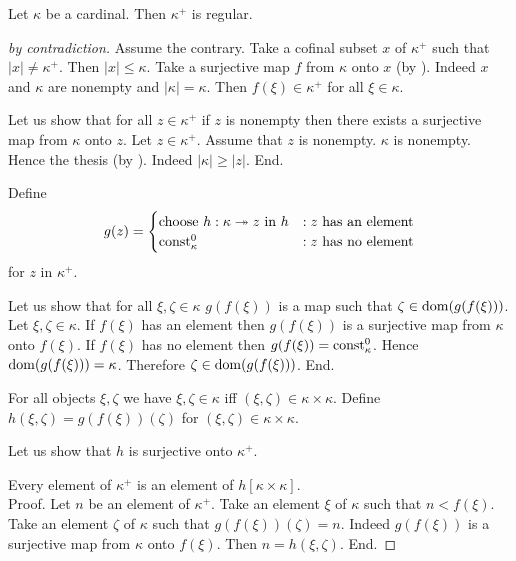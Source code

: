 \documentclass{article}
\begin{document}
  \begin{forthel}
    \begin{theorem*}[title=Hausdorff]
      Let $\kappa$ be a cardinal.
      Then $\kappa^+$ is regular.
    \end{theorem*}
    \begin{proof}[by contradiction]
      Assume the contrary.
      Take a cofinal subset $x$ of $\kappa^+$ such that $|x| \neq \kappa^+$.
      Then $|x| \leq \kappa$.
      Take a surjective map $f$ from $\kappa$ onto $x$ (by ).
      Indeed $x$ and $\kappa$ are nonempty and $|\kappa| = \kappa$.
      Then $f(\xi) \in \kappa^+$ for all $\xi \in \kappa$.

      Let us show that for all $z \in \kappa^+$ if $z$ is nonempty then there exists a surjective map from $\kappa$ onto $z$.
        Let $z \in \kappa^+$.
        Assume that $z$ is nonempty.
        $\kappa$ is nonempty.
        Hence the thesis (by ).
        Indeed $|\kappa| \geq |z|$.
      End.

      Define \[ g(z) =
        \begin{cases}
          \text{choose $h : \kappa \twoheadrightarrow z$ in $h$}
          & : \text{$z$ has an element}
          \\
          \text{$\textrm{const}_{\kappa}^{0}$}
          & : \text{$z$ has no element}
        \end{cases}
      \] for $z$ in $\kappa^+$.

      Let us show that for all $\xi, \zeta \in \kappa$ $g(f(\xi))$ is a map such that $\zeta \in \operatorname{dom}(g(f(\xi)))$.
        Let $\xi, \zeta \in \kappa$.
        If $f(\xi)$ has an element then $g(f(\xi))$ is a surjective map from $\kappa$ onto $f(\xi)$.
        If $f(\xi)$ has no element then $g(f(\xi)) = \textrm{const}_{\kappa}^{0}$.
        Hence $\operatorname{dom}(g(f(\xi))) = \kappa$.
        Therefore $\zeta \in \operatorname{dom}(g(f(\xi)))$.
      End.

      For all objects $\xi, \zeta$ we have $\xi, \zeta \in \kappa$ iff $(\xi, \zeta) \in \kappa \times \kappa$.
      Define $h(\xi,\zeta) = g(f(\xi))(\zeta)$ for $(\xi,\zeta) \in \kappa \times \kappa$.

      Let us show that $h$ is surjective onto $\kappa^+$.

        Every element of $\kappa^+$ is an element of $h[\kappa \times \kappa]$. \\
        Proof.
          Let $n$ be an element of $\kappa^+$.
          Take an element $\xi$ of $\kappa$ such that $n < f(\xi)$.
          Take an element $\zeta$ of $\kappa$ such that $g(f(\xi))(\zeta) = n$.
          Indeed $g(f(\xi))$ is a surjective map from $\kappa$ onto $f(\xi)$.
          Then $n = h(\xi,\zeta)$.
        End.


\end{proof}
\end{forthel}
\end{document}
